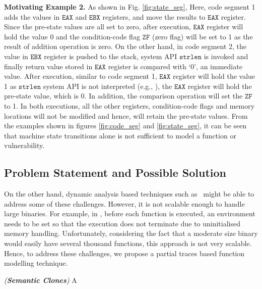 \noindent\textbf{Motivating Example 2.}
As shown in Fig. \ref{fig:state_seg}, {} %
Here, code segment 1 adds the values in $\mathtt{EAX}$ and $\mathtt{EBX}$ registers, and move the results to $\mathtt{EAX}$ register. Since the pre-state values are all set to zero, after execution, $\mathtt{EAX}$ register will hold the value 0 and the condition-code flag $\mathtt{ZF}$ (zero flag) will be set to 1 as the result of addition operation is zero. On the other hand, in code segment 2, the value in $\mathtt{EBX}$ register is pushed to the stack, system API $\mathtt{strlen}$ is invoked and finally return value stored in $\mathtt{EAX}$ register is compared with `0', an immediate value. After execution, similar to code segment 1, $\mathtt{EAX}$ register will hold the value 1 as $\mathtt{strlen}$ system API is not interpreted (e.g.,    \cite{pewnycross,ruttenberg2014identifying, luo2014semantics}), the  $\mathtt{EAX}$ register will hold the pre-state value, which is 0. In addition, the comparison operation will set the $\mathtt{ZF}$ to 1. In both executions, all the other registers, condition-code flags and memory locations will not be modified and hence, will retain the pre-state values. From the examples shown in figures \ref{fig:code_seg} and \ref{fig:state_seg}, it can be seen that machine state transitions alone is not sufficient to model a function or vulnerability.



\subsection{Problem Statement and Possible Solution}

On the other hand, dynamic analysis based techniques such as~\cite{egele2014blanket} might be able to address some of these challenges. However, it is not scalable enough to handle large binaries. For example, in \cite{egele2014blanket}, before each function is executed, an environment needs to be set so that the execution does not terminate due to uninitialised memory handling. Unfortunately, considering the fact that a moderate size binary would easily have several thousand functions, this approach is not very scalable. Hence, to address these challenges, we propose a partial traces based function modelling technique.

\begin{mydef}
\emph{(\textbf{Semantic Clones}) }
  A  
\end{mydef}
 

